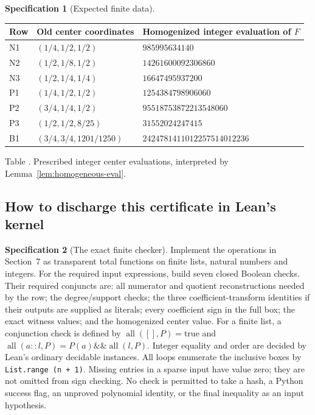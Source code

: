 \documentclass[11pt,a4paper]{article}
\theoremstyle{definition}
\newtheorem{specification}{Specification}[section]
\newcommand{\lean}[1]{{\small\nolinkurl{#1}}}
\begin{document}
\begin{specification}[Expected finite data]
\begin{center}
\small
\begin{tabular}{@{}lll@{}}
\toprule
Row & Old center coordinates & Homogenized integer evaluation of $F$\\
\midrule
N1 & $(1/4,1/2,1/2)$ & $985995634140$\\
N2 & $(1/2,1/8,1/2)$ & $14261600092306860$\\
N3 & $(1/2,1/4,1/4)$ & $16647495937200$\\
P1 & $(1/4,1/2,1/2)$ & $1254384798906060$\\
P2 & $(3/4,1/4,1/2)$ & $95518753872213548060$\\
P3 & $(1/2,1/2,8/25)$ & $31552024247415$\\
B1 & $(3/4,3/4,1201/1250)$ & $2424781411012257514012236$\\
\bottomrule
\end{tabular}
\label{tab:centers}\par\smallskip
\small Table \thetable. Prescribed integer center evaluations, interpreted by Lemma~\ref{lem:homogeneous-eval}.
\end{center}

\end{specification}

\subsection{How to discharge this certificate in Lean's kernel}
\begin{specification}[The exact finite checker]\label{spec:kernelchecker}
Implement the operations in Section~7 as transparent total functions on finite lists, natural numbers and integers. For the required input expressions, build seven closed Boolean checks. Their required conjuncts are: all numerator and quotient reconstructions needed by the row; the degree/support checks; the three coefficient-transform identities if their outputs are supplied as literals; every coefficient sign in the full box; the exact witness values; and the homogenized center value.
For a finite list, a conjunction check is defined by $\operatorname{all}([],P)=\mathrm{true}$ and $\operatorname{all}(a::l,P)=P(a)\mathbin{\&\&}\operatorname{all}(l,P)$. Integer equality and order are decided by Lean's ordinary decidable instances. All loops enumerate the inclusive boxes by \lean{List.range (n + 1)}. Missing entries in a sparse input have value zero; they are not omitted from sign checking.
No check is permitted to take a hash, a Python success flag, an unproved polynomial identity, or the final inequality as an input hypothesis.
\end{specification}
\end{document}
